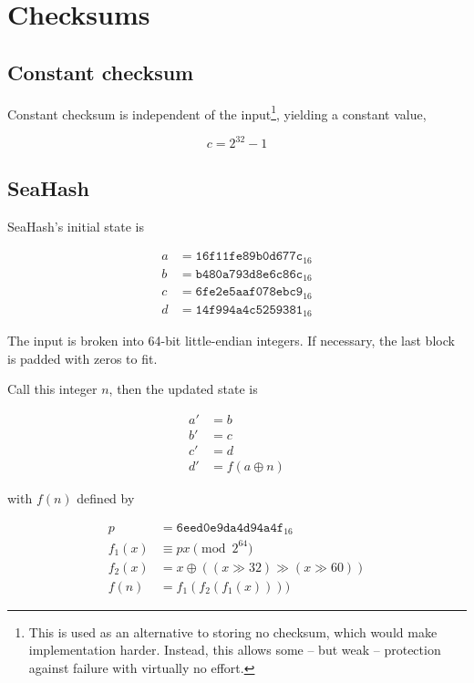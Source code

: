 \documentclass[11pt,a4paper]{report}
\begin{document}
    \section{Checksums}
        \subsection{Constant checksum}
        \label{checksum:seahash}
        Constant checksum is independent of the input\footnote{This is used as
        an alternative to storing no checksum, which would make implementation
        harder. Instead, this allows some -- but weak -- protection against failure
        with virtually no effort.}, yielding a constant value,

        $$c = 2^{32} - 1$$

        \subsection{SeaHash}
        \label{checksum:seahash}
        SeaHash's initial state is

        \begin{align*}
            a &= \texttt{16f11fe89b0d677c}_{16} \\
            b &= \texttt{b480a793d8e6c86c}_{16} \\
            c &= \texttt{6fe2e5aaf078ebc9}_{16} \\
            d &= \texttt{14f994a4c5259381}_{16}
        \end{align*}

        The input is broken into 64-bit little-endian integers. If necessary,
        the last block is padded with zeros to fit.

        Call this integer $n$, then the updated state is

        \begin{align*}
            a' &= b \\
            b' &= c \\
            c' &= d \\
            d' &= f(a \oplus n)
        \end{align*}

        with $f(n)$ defined by

        \begin{align*}
            p      &=      \texttt{6eed0e9da4d94a4f}_{16} \\
            f_1(x) &\equiv px \pmod{2^{64}} \\
            f_2(x) &=      x \oplus ((x \gg 32) \gg (x \gg 60)) \\
            f(n)   &=      f_1(f_2(f_1(x))))
        \end{align*}
\end{document}
